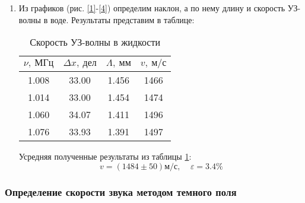 \documentclass{lab}
\begin{document}
\begin{enumerate}
\item
Из графиков (рис. \ref{1}-\ref{4}) определим наклон, а по нему длину и скорость УЗ-волны в воде. Результаты представим в таблице:
\begin{table}[H]
	\centering
	\begin{tabular}{|c|ccc|}
		\hline
		$ \nu,~МГц $ & $ \Delta x,~дел $ & $ \Lambda,~мм $ & $ v,~м/с $ \\ \hline
		1.008 & 33.00 & 1.456 & 1466 \\
		1.014 & 33.00 & 1.454 & 1474 \\
		1.060 & 34.07 & 1.411 & 1496 \\
		1.076 & 33.93 & 1.391 & 1497 \\ \hline
	\end{tabular}
	\caption{Скорость УЗ-волны в жидкости}
	\label{tab 2}
\end{table}

Усредняя полученные результаты из таблицы \ref{tab 2}:
\begin{equation}
v = (1484 \pm 50)м/с, ~~~~~ \varepsilon = 3.4\%
\end{equation}

\end{enumerate}

\subsubsection*{Определение скорости звука методом темного поля}
\end{document}
